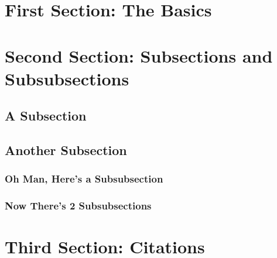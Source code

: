\documentclass[12pt]{article}
\begin{document}
\begin{singlespacing}




\end{singlespacing}


\section{First Section: The Basics}

\blindtext

\section{Second Section: Subsections and Subsubsections}

\blindtext

\subsection{A Subsection}

\blindtext

\subsection{Another Subsection}

\blindtext

\subsubsection{Oh Man, Here's a Subsubsection}

\blindtext

\subsubsection{Now There's 2 Subsubsections}

\blindtext

\section{Third Section: Citations}
\end{document}
